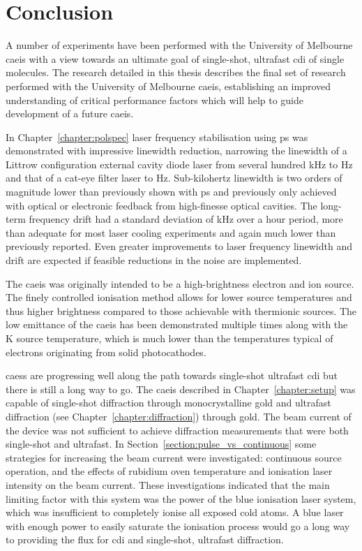\chapter{Conclusion}
\glsresetall

A number of experiments have been performed with the University of Melbourne \gls{caeis} with a view towards an ultimate goal of single-shot, ultrafast \gls{cdi} of single molecules.
The research detailed in this thesis describes the final set of research performed with the University of Melbourne \gls{caeis}, establishing an improved understanding of critical performance factors which will help to guide development of a future \gls{caeis}.

In Chapter~\ref{chapter:polspec} laser frequency stabilisation using \gls{ps} was demonstrated with impressive linewidth reduction, narrowing the linewidth of a Littrow configuration external cavity diode laser from several hundred kHz to \unit[600]{Hz} and that of a cat-eye filter laser to \unit[360]{Hz}.
Sub-kilohertz linewidth is two orders of magnitude lower than previously shown with \gls{ps} and previously only achieved with optical or electronic feedback from high-finesse optical cavities.
The long-term frequency drift had a standard deviation of \unit[51]{kHz} over a \unit[60]{hour} period, more than adequate for most laser cooling experiments and again much lower than previously reported.
Even greater improvements to laser frequency linewidth and drift are expected if feasible reductions in the noise are implemented.

The \gls{caeis} was originally intended to be a high-brightness electron and ion source.
The finely controlled ionisation method allows for lower source temperatures and thus higher brightness compared to those achievable with thermionic sources.
The low emittance of the \gls{caeis} has been demonstrated multiple times along with the \unit[10]{K} source temperature, which is much lower than the temperatures typical of electrons originating from solid photocathodes.

\Glspl{caes} are progressing well along the path towards single-shot ultrafast \gls{cdi} but there is still a long way to go.
The \gls{caeis} described in Chapter~\ref{chapter:setup} was capable of single-shot diffraction through monocrystalline gold and ultrafast diffraction (see Chapter~\ref{chapter:diffraction}) through gold.
The beam current of the device was not sufficient to achieve diffraction measurements that were both single-shot and ultrafast.
In Section~\ref{section:pulse_vs_continuous} some strategies for increasing the beam current were investigated: continuous source operation, and the effects of rubidium oven temperature and ionisation laser intensity on the beam current.
These investigations indicated that the main limiting factor with this system was the power of the blue ionisation laser system, which was insufficient to completely ionise all exposed cold atoms.
A blue laser with enough power to easily saturate the ionisation process would go a long way to providing the flux for \gls{cdi} and single-shot, ultrafast diffraction.

